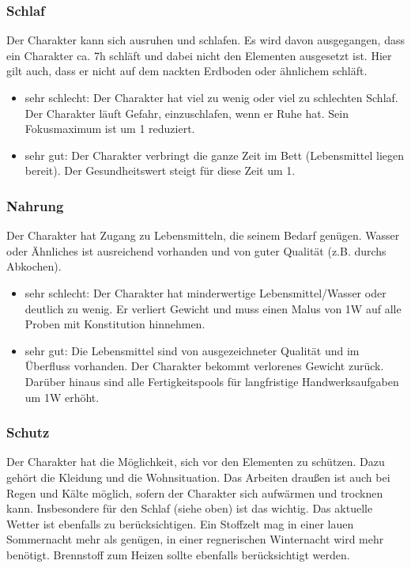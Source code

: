\documentclass{article}
\begin{document}
\subsubsection{Schlaf}

Der Charakter kann sich ausruhen und schlafen. Es wird davon ausgegangen, dass ein Charakter ca. 7h schläft und dabei
nicht den Elementen ausgesetzt ist. Hier gilt auch, dass er nicht auf dem nackten Erdboden oder ähnlichem schläft.

\begin{itemize}
\item sehr schlecht: Der Charakter hat viel zu wenig oder viel zu schlechten Schlaf. Der Charakter läuft Gefahr, einzuschlafen, wenn er Ruhe hat. Sein Fokusmaximum ist um 1 reduziert.
\item sehr gut: Der Charakter verbringt die ganze Zeit im Bett (Lebensmittel liegen bereit). Der Gesundheitswert steigt für diese Zeit um 1.
\end{itemize}

\subsubsection{Nahrung}

Der Charakter hat Zugang zu Lebensmitteln, die seinem Bedarf genügen. Wasser oder Ähnliches ist ausreichend vorhanden
und von guter Qualität (z.B. durchs Abkochen).

\begin{itemize}
\item sehr schlecht: Der Charakter hat minderwertige Lebensmittel/Wasser oder deutlich zu wenig. Er verliert Gewicht und muss einen Malus von 1W auf alle Proben mit Konstitution hinnehmen.
\item sehr gut: Die Lebensmittel sind von ausgezeichneter Qualität und im Überfluss vorhanden. Der Charakter bekommt verlorenes Gewicht zurück. Darüber hinaus sind alle Fertigkeitspools für langfristige Handwerksaufgaben um 1W erhöht.
\end{itemize}

\subsubsection{Schutz}

Der Charakter hat die Möglichkeit, sich vor den Elementen zu schützen. Dazu gehört die Kleidung und die Wohnsituation.
Das Arbeiten draußen ist auch bei Regen und Kälte möglich, sofern der Charakter sich aufwärmen und trocknen kann.
Insbesondere für den Schlaf (siehe oben) ist das wichtig. Das aktuelle Wetter ist ebenfalls zu berücksichtigen. Ein
Stoffzelt mag in einer lauen Sommernacht mehr als genügen, in einer regnerischen Winternacht wird mehr benötigt.
Brennstoff zum Heizen sollte ebenfalls berücksichtigt werden.
\end{document}
